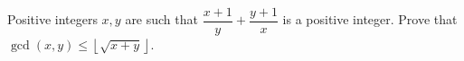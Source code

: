 Positive integers $x,y$ are such that $\dfrac{x+1}{y}+\dfrac{y+1}{x}$ is a positive integer. Prove that $\gcd(x,y)\le\left\lfloor\sqrt{x+y}\right\rfloor$.
